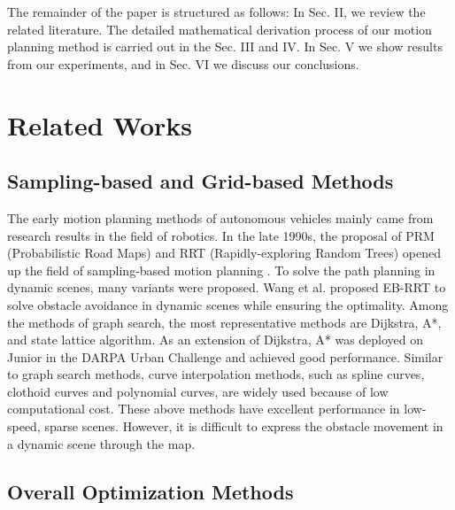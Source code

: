 \documentclass[conference]{IEEEtran}
\begin{document}
The remainder of the paper is structured as follows: In Sec. II, we review the related literature. The detailed mathematical derivation process of our motion planning method is carried out in the Sec. III and IV. In Sec. V we show results from our experiments, and in Sec. VI we discuss our conclusions.




\section{Related Works}

\subsection{Sampling-based  and Grid-based Methods}

The early motion planning methods of autonomous vehicles mainly came from research results in the field of robotics.
%
In the late 1990s, the proposal of PRM (Probabilistic Road Maps) and RRT (Rapidly-exploring Random Trees) opened up the field of sampling-based motion planning \cite{chi2018risk}. To solve the path planning in dynamic scenes, many variants were proposed. Wang et al. proposed EB-RRT to solve obstacle avoidance in dynamic scenes while ensuring the optimality\cite{wang2020eb}. 
%
Among the methods of graph search, the most representative methods are Dijkstra, A*, and state lattice algorithm. As an extension of Dijkstra, A* was deployed on Junior in the DARPA Urban Challenge and achieved good performance\cite{2008Odin}.
%
Similar to graph search methods, curve interpolation methods, such as spline curves\cite{piazzi2002quintic}, clothoid curves\cite{brezak2013real} and polynomial curves\cite{petrov2014modeling}, are widely used because of low computational cost.
%
These above methods have excellent performance in low-speed, sparse scenes. However, it is difficult to express the obstacle movement in a dynamic scene through the map.


\subsection{Overall Optimization Methods}
\end{document}
